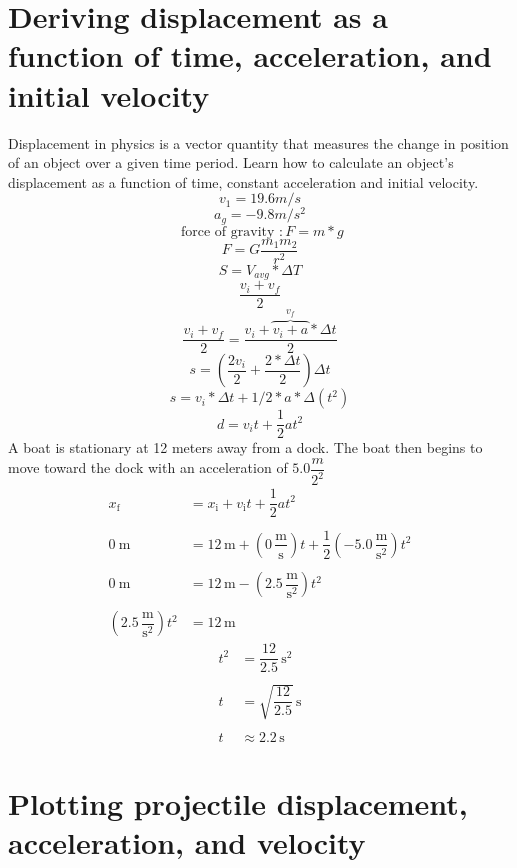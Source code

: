 \documentclass{article}
\theoremstyle{mytheoremstyle}
\theoremstyle{mytheoremstyle}
\theoremstyle{myproblemstyle}
\begin{document}
\section{Deriving displacement as a function of time, acceleration, and initial velocity}
Displacement in physics is a vector quantity that measures the change in position of an object over a given time period. Learn how to calculate an object’s displacement as a function of time, constant acceleration and initial velocity.
$$v_1 = 19.6m/s$$
$$a_g = -9.8m/s^2$$
$$\text{ force of gravity }: F = m*g$$
$$F = G\dfrac{m_1m_2}{r^2}$$
$$S = V_{avg} * \Delta{T}$$
$$\dfrac{v_i+v_f}{2}$$
$$\dfrac{v_i+v_f}{2} = \dfrac{v_i + \overbrace{v_i + a}^{v_f}*{\Delta{t}}}{2}$$
$$s=(\dfrac{2v_i}{2}+\dfrac{2*\Delta{t}}{2})\Delta{t}$$
$$s = v_i*\Delta{t}+1/2*a*\Delta(t^2)$$
$$d = v_it+\dfrac{1}{2}at^2$$
A boat is stationary at 12 meters away from a dock. The boat then begins to move toward the dock with an acceleration of $5.0\dfrac{m}{2^2}$
$$\begin{aligned}
        x_{\text{f}}                            & =x_{\text{i}}+v_{\text{i}}t+\dfrac{1}{2}at^2                                                          \\\\
        0\ \text{m}                             & =12\, \text{m}+(0\, \dfrac{\text{m}}{\text{s}})t+\dfrac{1}{2}(-5.0\, \dfrac{\text{m}}{\text{s}^2})t^2 \\\\
        0\ \text{m}                             & =12\, \text{m}-(2.5\, \dfrac{\text{m}}{\text{s}^2})t^2                                                \\\\
        (2.5\, \dfrac{\text{m}}{\text{s}^2})t^2 & =12\, \text{m}
    \end{aligned}$$
$$\begin{aligned}
        t^2 & ={\dfrac{12}{2.5}}{\, \text{s}^2}    \\\\
        t   & =\sqrt{\dfrac{12}{2.5}}{\, \text{s}} \\\\
        t   & \approx2.2\,\text{s}
    \end{aligned}$$
\section{Plotting projectile displacement, acceleration, and velocity}
\end{document}
